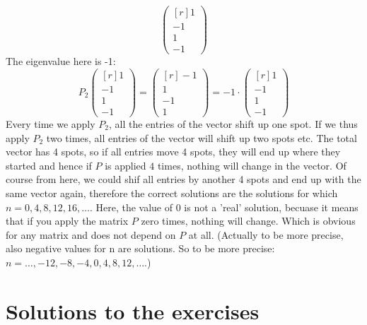 \documentclass[a4paper]{report}
\begin{document}
\begin{Answer}[ref=eigen3]
\begin{equation*}
\begin{pmatrix*}[r] 1 \\ -1 \\ 1 \\ -1 \end{pmatrix*}
\end{equation*}
The eigenvalue here is -1:
\begin{equation*}
P_2 \begin{pmatrix*}[r] 1 \\ -1 \\ 1 \\ -1 \end{pmatrix*} = \begin{pmatrix*}[r] -1 \\ 1 \\ -1 \\ 1 \end{pmatrix*} = -1 \cdot  \begin{pmatrix*}[r] 1 \\ -1 \\ 1 \\ -1 \end{pmatrix*} 
\end{equation*}
\Question Every time we apply $P_2$, all the entries of the vector shift up one spot. If we thus apply $P_2$ two times, all entries of the vector will shift up two spots etc. The total vector has 4 spots, so if all entries move 4 spots, they will end up where they started and hence if $P$ is applied $4$ times, nothing will change in the vector. Of course from here, we could shif all entries by another 4 spots and end up with the same vector again, therefore the correct solutions are the solutions for which $n = 0, 4, 8, 12, 16, \dots$. Here, the value of $0$ is not a 'real' solution, becuase it means that if you apply the matrix $P$ zero times, nothing will change. Which is obvious for any matrix and does not depend on $P$ at all. (Actually to be more precise, also negative values for n are solutions. So to be more precise: $ n = \dots, -12 , -8, -4, 0, 4, 8, 12, \dots$.) 
\end{Answer}

\chapter{Solutions to the exercises}
\shipoutAnswer
\end{document}
